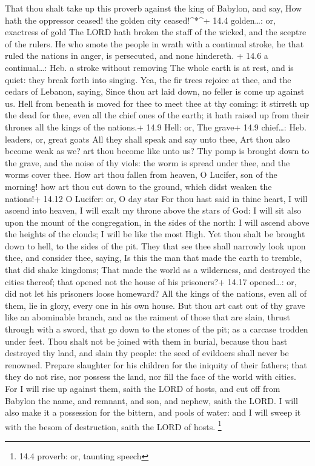  That thou shalt take up this proverb against the king of
Babylon, and say, How hath the oppressor ceased! the golden city
ceased!\^{}*\^{}+ 14.4 golden\ldots: or, exactress of gold 
The LORD hath broken the staff of the wicked, and the sceptre of the
rulers.  He who smote the people in wrath with a continual
stroke, he that ruled the nations in anger, is persecuted, and none
hindereth. + 14.6 a continual\ldots: Heb. a stroke without removing
 The whole earth is at rest, and is quiet: they break forth
into singing.  Yea, the fir trees rejoice at thee, and the
cedars of Lebanon, saying, Since thou art laid down, no feller is come
up against us.  Hell from beneath is moved for thee to meet
thee at thy coming: it stirreth up the dead for thee, even all the chief
ones of the earth; it hath raised up from their thrones all the kings of
the nations.+ 14.9 Hell: or, The grave+ 14.9 chief\ldots: Heb. leaders,
or, great goats  All they shall speak and say unto thee,
Art thou also become weak as we? art thou become like unto us?
 Thy pomp is brought down to the grave, and the noise of
thy viols: the worm is spread under thee, and the worms cover thee.
 How art thou fallen from heaven, O Lucifer, son of the
morning! how art thou cut down to the ground, which didst weaken the
nations!+ 14.12 O Lucifer: or, O day star  For thou hast
said in thine heart, I will ascend into heaven, I will exalt my throne
above the stars of God: I will sit also upon the mount of the
congregation, in the sides of the north:  I will ascend
above the heights of the clouds; I will be like the most High.
 Yet thou shalt be brought down to hell, to the sides of
the pit.  They that see thee shall narrowly look upon thee,
and consider thee, saying, Is this the man that made the earth to
tremble, that did shake kingdoms;  That made the world as a
wilderness, and destroyed the cities thereof; that opened not the house
of his prisoners?+ 14.17 opened\ldots: or, did not let his prisoners
loose homeward?  All the kings of the nations, even all of
them, lie in glory, every one in his own house.  But thou
art cast out of thy grave like an abominable branch, and as the raiment
of those that are slain, thrust through with a sword, that go down to
the stones of the pit; as a carcase trodden under feet. 
Thou shalt not be joined with them in burial, because thou hast
destroyed thy land, and slain thy people: the seed of evildoers shall
never be renowned.  Prepare slaughter for his children for
the iniquity of their fathers; that they do not rise, nor possess the
land, nor fill the face of the world with cities.  For I
will rise up against them, saith the LORD of hosts, and cut off from
Babylon the name, and remnant, and son, and nephew, saith the LORD.
 I will also make it a possession for the bittern, and
pools of water: and I will sweep it with the besom of destruction, saith
the LORD of hosts. \footnote{14.4 proverb: or, taunting speech}

